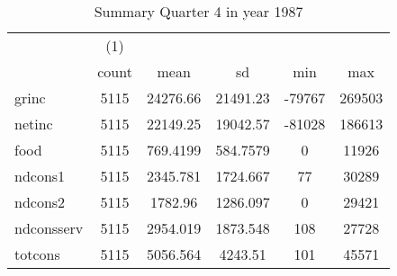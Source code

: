 \begin{table}[htbp]\centering
\def\sym#1{\ifmmode^{#1}\else\(^{#1}\)\fi}
\caption{Summary Quarter 4 in year 1987 \label{sum\_Q4\_y1987}}
\begin{tabular}{l*{1}{ccccc}}
\hline\hline
            &\multicolumn{1}{c}{(1)}&            &            &            &            \\
            &       count&        mean&          sd&         min&         max\\
\hline
grinc       &        5115&    24276.66&    21491.23&      -79767&      269503\\
netinc      &        5115&    22149.25&    19042.57&      -81028&      186613\\
food        &        5115&    769.4199&    584.7579&           0&       11926\\
ndcons1     &        5115&    2345.781&    1724.667&          77&       30289\\
ndcons2     &        5115&     1782.96&    1286.097&           0&       29421\\
ndconsserv  &        5115&    2954.019&    1873.548&         108&       27728\\
totcons     &        5115&    5056.564&     4243.51&         101&       45571\\
\hline\hline
\end{tabular}
\end{table}
